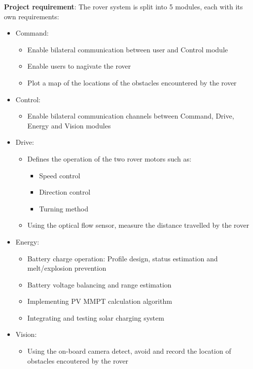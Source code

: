 \documentclass[11pt, a4paper]{article}
\begin{document}
\textbf{Project requirement}: The rover system is split into 5 modules, each with its own requirements:
\begin{itemize}
    \item Command:
    \begin{itemize}
        \item Enable bilateral communication between user and Control module 
        \item Enable users to nagivate the rover 
        \item Plot a map of the locations of the obstacles encountered by the rover   
    \end{itemize}

    \item Control:
    \begin{itemize}
        \item Enable bilateral communication channels between Command, Drive, Energy and Vision modules
    \end{itemize}
    
    \item Drive:
    \begin{itemize}
        \item Defines the operation of the two rover motors such as:
        \begin{itemize}
            \item Speed control 
            \item Direction control 
            \item Turning method 
        \end{itemize}
        \item Using the optical flow sensor, measure the distance travelled by the rover 
    \end{itemize}
    
    \item Energy:
    \begin{itemize}
        \item Battery charge operation: Profile design, status estimation and melt/explosion prevention 
        \item Battery voltage balancing and range estimation 
        \item Implementing PV MMPT calculation algorithm 
        \item Integrating and testing solar charging system  
    \end{itemize}
    
    \item Vision:
    \begin{itemize}
        \item Using the on-board camera detect, avoid and record the location of obstacles encoutered by the rover  
    \end{itemize} 
\end{itemize}
\end{document}
